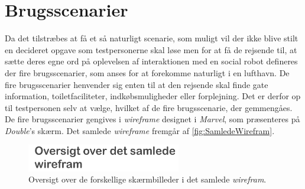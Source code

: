 \section{Brugsscenarier}
\label{ParametreBrugsscenarier}
%
Da det tilstræbes at få et så naturligt scenarie, som muligt vil der ikke blive stilt en decideret opgave som testpersonerne skal løse men for at få de rejsende til, at sætte deres egne ord på oplevelsen af interaktionen med en social robot defineres der fire brugsscenarier, som anses for at forekomme naturligt i en lufthavn. De fire brugsscenarier henvender sig enten til at den rejsende skal finde gate information, toiletfaciliteter, indkøbsmuligheder eller forplejning. Det er derfor op til testpersonen selv at vælge, hvilket af de fire brugsscenarie, der gemmengåes. De fire brugsscenarier gengives i \textit{wireframe} designet i \textit{Marvel}, som præsenteres på \textit{Double}'s skærm. Det samlede \textit{wireframe} fremgår af \autoref{fig:SamledeWirefram}.
%
\begin{figure}[H]
\centering
\includegraphics[width = 0.6\textwidth]{Figure/SamledeWirefram} 
\caption{Oversigt over de forskellige skærmbilleder i det samlede \textit{wirefram}.}
\label{fig:SamledeWirefram}
\end{figure}
\noindent
%  

